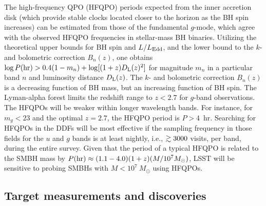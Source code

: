 The high-frequency QPO (HFQPO) periods expected from the inner accretion disk
(which provide stable clocks located closer to the horizon as the BH spin increases)
can be estimated from those of the fundamental $g$-mode, which agree with
the observed HFQPO frequencies in stellar-mass BH binaries. Utilizing the
theoretical upper bounds for BH spin and $L/L_{\rm Edd}$, and the lower
bound to the $k$- and bolometric correction $B_n(z)$, one obtains
$\log P({\rm hr}) > 0.4(1-m_n) + \log[(1+z)D_{\rm L}(z)^2]$ for magnitude
$m_n$ in a particular band $n$ and luminosity distance $D_{\rm L}(z)$.
The $k$- and bolometric correction $B_n(z)$ is a decreasing function of BH mass,
but an increasing function of BH spin. The Lyman-alpha forest limits the redshift
range to $z < 2.7$ for $g$-band observations. The HFQPOs will be weaker within longer
wavelength bands.
For instance, for $m_g  <  23$ and the optimal $z =  2.7$, the HFQPO period is $P > 4$~hr.
%
Searching for HFQPOs in the DDFs will be most effective if the sampling frequency
in those fields for the $u$ and $g$ bands is at least nightly, i.e., $\gtrsim3000$
visits, per band, during the entire survey. Given that the period of a typical HFQPO is
related to the SMBH mass by $P({\rm hr}) \approx (1.1-4.0)(1+z)(M/10^{7}M_{\odot})$,
LSST will be sensitive to probing SMBHs with $M < 10^{7}~M_{\odot}$ using HFQPOs.



\subsection{Target measurements and discoveries}
\label{sec:\secname:targets}


